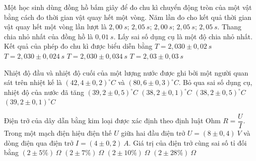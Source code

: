 \begin{vidu} %
Một học sinh dùng đồng hồ bấm giây để đo chu kì chuyển động tròn của một vật bằng cách đo thời gian vật quay hết một vòng. Năm lần đo cho kết quả thời gian vật quay hết một vòng lần lượt là $2,00\ s$; $2,05\ s$; $2,00\ s$; $2,05\ s$; $2,05\ s$. Thang chia nhỏ nhất của đồng hồ là $0,01\ s$. Lấy sai số dụng cụ là một độ chia nhỏ nhất. Kết quả của phép đo chu kì được biểu diễn bằng
\choice
{$T = 2,030 \pm  0,02\ s$}
{$T = 2,030 \pm  0,024\ s$}
{\True $T = 2,030 \pm  0,034\ s$}
{$T = 2,03 \pm  0,03\ s$}
\end{vidu}
\begin{vidu}
Nhiệt độ đầu và nhiệt độ cuối của một lượng nước được ghi bởi một người quan sát trên nhiệt kế là $(42,4 \pm 0,2)^\circ C$ và $(80,6 \pm 0,3)^\circ C$. Bỏ qua sai số dụng cụ, nhiệt độ của nước đã tăng
\choice
{$(39,2 \pm 0,5)^\circ C$}
{$(38,2 \pm 0,1)^\circ C$}
{\True $(38,2 \pm 0,5)^\circ C$}
{$(39,2 \pm 0,1)^\circ C$}
\end{vidu}
\begin{vidu}
Điện trở của dây dẫn bằng kim loại được xác định theo định luật Ohm $R=\dfrac{U}{I}$. Trong một mạch điện hiệu điện thế $U$ giữa hai đầu điện trở $U=(8 \pm 0,4)\ V$ và dòng điện qua điện trở $I=(4 \pm 0,2)\ A$. Giá trị của điện trở cùng sai số tỉ đối bằng
\choice
{$(2 \pm 5\%)\ \Omega$}
{$(2 \pm 7\%)\ \Omega$}
{\True $(2 \pm 10\%)\ \Omega$}
{$(2 \pm 28\%)\ \Omega$}
\loigiai{
}
\end{vidu}
